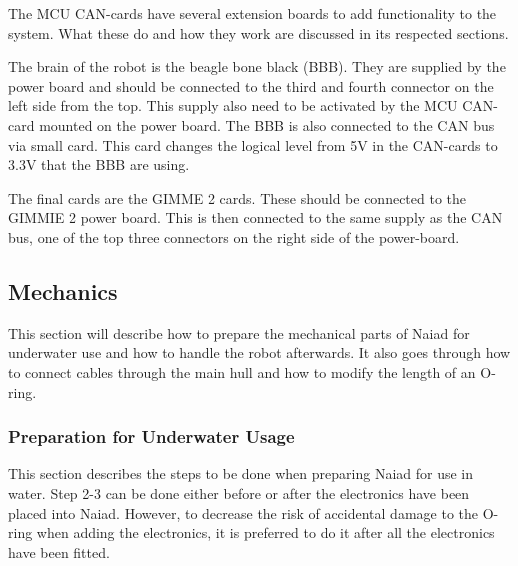 The MCU CAN-cards have several extension boards to add functionality to the system. What these do and how they work are discussed in its respected sections. 

The brain of the robot is the beagle bone black (BBB). They are supplied by the power board and should be connected to the third and fourth connector on the left side from the top. This supply also need to be activated by the MCU CAN-card mounted on the power board. The BBB is also connected to the CAN bus via small card. This card changes the logical level from 5V in the CAN-cards to 3.3V that the BBB are using.  

The final cards are the GIMME 2 cards. These should be connected to the GIMMIE 2 power board. This is then connected to the same supply as the CAN bus, one of the top three connectors on the right side of the power-board.  

\subsection{Mechanics}
 \noindent This section will describe how to prepare the mechanical parts of Naiad for underwater use and how to handle the robot afterwards. It also goes through how to connect cables through the main hull and how to modify the length of an O-ring.
 	 \subsubsection{Preparation for Underwater Usage}
 	 \label{hullmanual}
	\noindent This section describes the steps to be done when preparing Naiad for use in water. Step 2-3 can be done either before or after the electronics have been placed into Naiad. However, to decrease the risk of accidental damage to the O-ring when adding the electronics, it is preferred to do it after all the electronics have been fitted.

